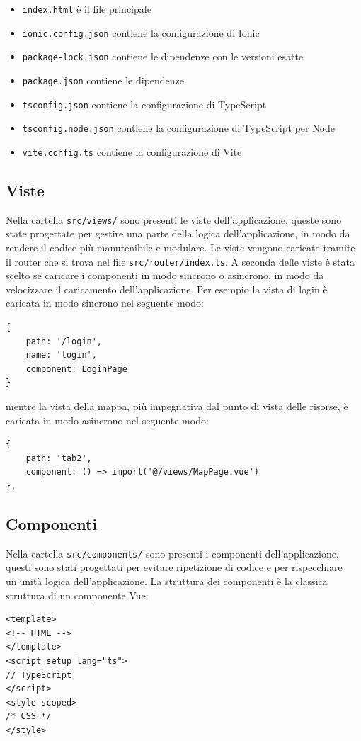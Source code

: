 \documentclass{article}
\begin{document}
\begin{itemize}
    \item \texttt{index.html} è il file principale
    \item \texttt{ionic.config.json} contiene la configurazione di Ionic
    \item \texttt{package-lock.json} contiene le dipendenze con le versioni esatte
    \item \texttt{package.json} contiene le dipendenze
    \item \texttt{tsconfig.json} contiene la configurazione di TypeScript
    \item \texttt{tsconfig.node.json} contiene la configurazione di TypeScript per Node
    \item \texttt{vite.config.ts} contiene la configurazione di Vite
\end{itemize}

\subsection{Viste}
Nella cartella \texttt{src/views/} sono presenti le viste dell'applicazione, queste sono state progettate per gestire una parte della logica dell'applicazione, in modo da rendere il codice più manutenibile e modulare.
Le viste vengono caricate tramite il router che si trova nel file \texttt{src/router/index.ts}. A seconda delle viste è stata scelto se caricare i componenti in modo sincrono o asincrono, in modo da velocizzare il caricamento dell'applicazione. Per esempio la vista di login è caricata in modo sincrono nel seguente modo:
\begin{verbatim}
{
    path: '/login',
    name: 'login',
    component: LoginPage
}
\end{verbatim}
mentre la vista della mappa, più impegnativa dal punto di vista delle risorse, è caricata in modo asincrono nel seguente modo:
\begin{verbatim}
{
    path: 'tab2',
    component: () => import('@/views/MapPage.vue')
},
\end{verbatim}

\subsection{Componenti}
Nella cartella \texttt{src/components/} sono presenti i componenti dell'applicazione, questi sono stati progettati per evitare ripetizione di codice e per rispecchiare un'unità logica dell'applicazione.
La struttura dei componenti è la classica struttura di un componente Vue:
\begin{verbatim}
<template>
<!-- HTML -->
</template>
<script setup lang="ts">
// TypeScript
</script>
<style scoped>
/* CSS */
</style>
\end{verbatim}
\end{document}
